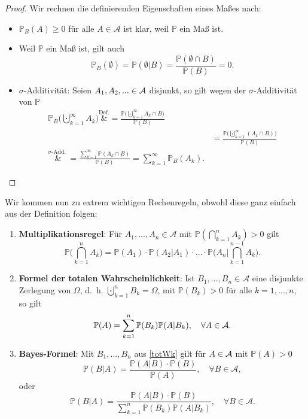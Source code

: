 \begin{proof}
	Wir rechnen die definierenden Eigenschaften eines Ma\ss es nach:
	\begin{itemize}
		\item $\mathbb P_B(A) \geq 0$ f\"ur alle $A\in \mathcal A$ ist klar, weil $\mathbb P$ ein Ma\ss{} ist.
		\item Weil $\mathbb P$ ein Ma\ss{} ist, gilt auch 
		\[ \mathbb{P}_B(\emptyset) = \mathbb{P}(\emptyset|B) = \frac{\mathbb{P}(\emptyset \cap B)}{\mathbb{P}(B)} = 0. \]
		\item $\sigma$-Additivität: Seien $A_1,A_2,... \in \mathcal{A}$ disjunkt, so gilt wegen der $\sigma$-Additivit\"at von $\mathbb P$
		\begin{align*}
			\mathbb{P}_B\big(\bigcupdot_{k=1}^{\infty} A_k \big) \overset{\text{Def.}}&{=} \frac{\mathbb{P}\big(\bigcupdot_{k=1}^{\infty} A_k \cap B\big)}{\mathbb{P}(B)}\\
			&= \frac{\mathbb{P}\big(\bigcupdot_{k=1}^{\infty} (A_k \cap B) \big)}{\mathbb{P}(B)} \\
			\overset{\sigma\text{-Add. }}&{=} \frac{\sum\limits_{k=1}^{\infty} \mathbb{P}(A_k \cap B)}{\mathbb{P}(B)}
			= \sum\limits_{k=1}^{\infty} \mathbb{P}_B(A_k).
		\end{align*}
	\end{itemize}
\end{proof}
Wir kommen nun zu extrem wichtigen Rechenregeln, obwohl diese ganz einfach aus der Definition folgen:
\begin{satz}  \abs

	\begin{enumerate}[label=(\roman*)]
		\item \label{multipl} \textbf{Multiplikationsregel}: Für $A_1,...,A_n\in \mathcal A$ mit $\mathbb{P}(\bigcap_{k=1}^{n} A_k) > 0$ gilt
		\[ \mathbb{P}\Big(\bigcap_{k=1}^{n} A_k\Big) = \mathbb{P}(A_1)\cdot \mathbb{P}(A_2|A_1)\cdot ... \cdot \mathbb{P}\Big(A_n\Big|\bigcap_{k=1}^{n-1} A_k\Big). \]
		\item \label{totWk} \textbf{Formel der totalen Wahrscheinlichkeit}: Ist $B_1,...,B_n\in \mathcal A$ eine disjunkte Zerlegung von $\Omega$, \mbox{d. h.}  $\bigcupdot_{k=1}^{n} B_k = \Omega$, mit $\mathbb P(B_k)>0$ f\"ur alle $k=1,...,n$, so gilt 
		\[ \mathbb{P}(A) = \sum\limits_{k=1}^{n} \mathbb{P}(B_k)\mathbb{P}(A|B_k), \quad \forall A \in \mathcal{A}. \]
		\item \label{bayes} \textbf{Bayes-Formel}: Mit $B_1,...,B_n$ aus \ref{totWk} gilt für $A \in \mathcal{A}$ mit $\mathbb{P}(A) > 0$ \[ \mathbb{P}(B|A) = \frac{\mathbb{P}(A|B) \cdot \mathbb{P}(B)}{\mathbb{P}(A)},\quad \forall B\in \mathcal A, \] oder \[ \mathbb{P}(B|A) = \frac{\mathbb{P}(A|B) \cdot \mathbb{P}(B)}{\sum\limits_{k=1}^{n} \mathbb{P}(B_k) \mathbb{P}(A | B_k)},\quad \forall B\in \mathcal A. \]
	\end{enumerate}
\end{satz}

